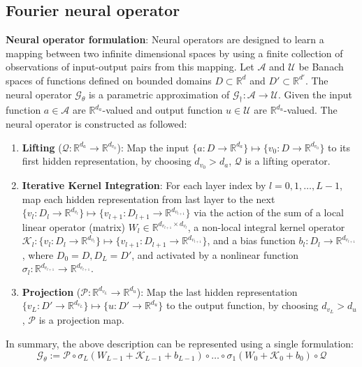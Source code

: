 \documentclass{article}
\begin{document}
\subsection{Fourier neural operator}
\textbf{Neural operator formulation}: Neural operators are designed to learn a mapping between two infinite dimensional spaces by using a finite collection of observations of input-output pairs from this mapping. Let $\mathcal{A}$ and $\mathcal{U}$ be Banach spaces of functions defined on bounded domains $D\subset \mathbb{R}^d$ and $D'\subset\mathbb{R}^{d'}$. The neural operator $\mathcal{G}_{\theta}$ is a parametric approximation of $\mathcal{G}_{\dagger}:\mathcal{A}\to\mathcal{U}$. Given the input function $a\in\mathcal{A}$ are $\mathbb{R}^{d_a}$-valued and output function $u\in\mathcal{U}$ are $\mathbb{R}^{d_u}$-valued. The neural operator is constructed as followed\cite{kovachki2023neural}:
\begin{enumerate}
    \item \textbf{Lifting} ($\mathcal{Q}:\mathbb{R}^{d_a}\to\mathbb{R}^{d_{v_0}}$): Map the input $\{a:D\to\mathbb{R}^{d_a}\} \mapsto \{v_0: D\to \mathbb{R}^{d_{v_0}}\}$ to its first hidden representation, by choosing $d_{v_0} > d_a$, $\mathcal{Q}$ is a lifting operator.
    \item \textbf{Iterative Kernel Integration}: For each layer index by $l=0,1,\dots,L-1$, map each hidden representation from last layer to the next $\{v_l:D_l\to\mathbb{R}^{d_{v_l}}\}\mapsto\{v_{l+1}:D_{l+1}\to\mathbb{R}^{d_{v_{l+1}}}\}$ via the action of the sum of a local linear operator (matrix) $W_l\in\mathbb{R}^{d_{v_{l+1}}\times d_{v_l}}$, a non-local integral kernel operator $\mathcal{K}_l:\{v_l:D_l\to\mathbb{R}^{d_{v_l}}\}\mapsto\{v_{l+1}:D_{l+1}\to\mathbb{R}^{d_{v_{l+1}}}\}$, and a bias function $b_l:D_l\to\mathbb{R}^{d_{v_{l+1}}}$, where $D_0=D, D_{L}=D'$, and activated by a nonlinear function $\sigma_l: \mathbb{R}^{d_{v_{l+1}}}\to\mathbb{R}^{d_{v_{l+1}}}$.
    \item \textbf{Projection} ($\mathcal{P}:\mathbb{R}^{d_{v_{L}}}\to\mathbb{R}^{d_u}$): Map the last hidden representation $\{v_L:D'\to\mathbb{R}^{d_{v_L}}\} \mapsto \{u: D'\to \mathbb{R}^{d_{u}}\}$ to the output function, by choosing $d_{v_L}>d_{u}$, $\mathcal{P}$ is a projection map.
\end{enumerate}
In summary, the above description can be represented using a single formulation:
\begin{equation} \label{eq: neural operator}
    \mathcal{G}_{\theta} := \mathcal{P}\circ \sigma_L(W_{L-1}+\mathcal{K}_{L-1}+b_{L-1})\circ\dots\circ\sigma_1(W_0+\mathcal{K}_0+b_0)\circ\mathcal{Q}
\end{equation}
\end{document}
